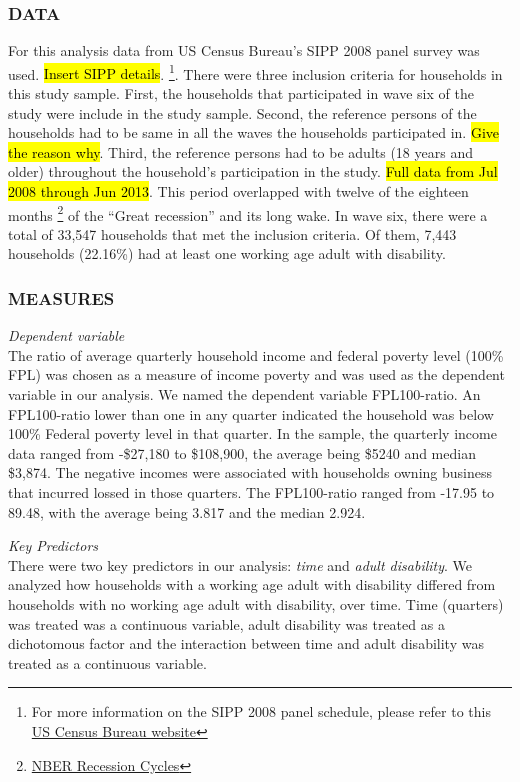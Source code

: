 \documentclass[11pt]{extarticle} %
\begin{document}
\subsubsection*{DATA}
For this analysis data from US Census Bureau's SIPP 2008 panel survey was used. {\hl{Insert SIPP details}}. {\footnote{For more information on the SIPP 2008 panel schedule, please refer to this \href{http://www.census.gov/programs-surveys/sipp/data/2008-panel.html}{US Census Bureau website}}}. There were three inclusion criteria for households in this study sample. First, the households that participated in wave six of the study were include in the study sample. Second, the reference persons of the households had to be same in all the waves the households participated in. {\hl{Give the reason why}}. Third, the reference persons had to be adults (18 years and older) throughout the household's participation in the study. {\hl{Full data from Jul 2008 through Jun 2013}}. This period overlapped with twelve of the eighteen months {\footnote{\href{http://www.nber.org/cycles/}{NBER Recession Cycles}}} of the ``Great recession'' and its long wake. In wave six, there were a total of 33,547 households that met the inclusion criteria. Of them, 7,443  households (22.16\%) had at least one working age adult with disability.

\subsubsection*{MEASURES}
\noindent
{\emph{Dependent variable}}\\
The ratio of average quarterly household income and federal poverty level (100\% FPL) was chosen as a measure of income poverty and was used as the dependent variable in our analysis. We named the dependent variable FPL100-ratio. An FPL100-ratio lower than one in any quarter indicated the household was below 100\% Federal poverty level in that quarter. In the sample, the quarterly income data ranged from -\$27,180 to \$108,900, the average being \$5240 and median \$3,874. The negative incomes were associated with households owning business that incurred lossed in those quarters. The FPL100-ratio ranged from -17.95 to 89.48, with the average being 3.817 and the median 2.924. 

\noindent
{\emph{Key Predictors}}\\
There were two key predictors in our analysis: {\emph{time}} and {\emph{adult disability}}. We analyzed how households with a working age adult with disability differed from households with no working age adult with disability, over time. Time (quarters) was treated was a continuous variable, adult disability was treated as a dichotomous factor and the interaction between time and adult disability was treated as a continuous variable. 
\end{document}
